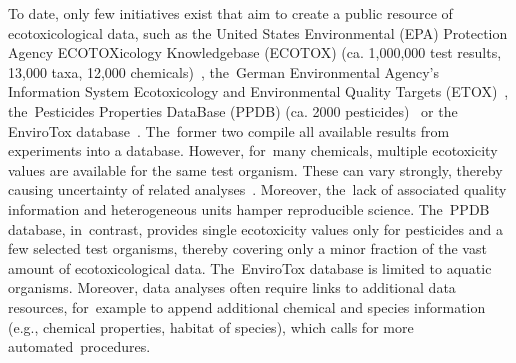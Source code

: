 \documentclass[data,datadescriptor,accept,moreauthors,pdftex]{Definitions/mdpi}
\begin{document}
To date, only few initiatives exist that aim to create a public resource of ecotoxicological data, such as the United States Environmental (EPA) Protection Agency ECOTOXicology Knowledgebase (ECOTOX) (ca. 1,000,000 test results, 13,000 taxa, 12,000 chemicals)~\citep{epa_ecotoxicology_2020}, the~German Environmental Agency's Information System Ecotoxicology and Environmental Quality Targets (ETOX)~\citep{umweltbundesamt_etox_2019}, the~Pesticides Properties DataBase (PPDB) (ca. 2000 pesticides)~\citep{lewis_international_2016} or the EnviroTox database~\citep{healthandenvironmentalsciencesinstitutehesi_envirotox_2019, connors_creation_2019}. The~former two compile all available results from experiments into a database. However, for~many chemicals, multiple ecotoxicity values are available for the same test organism. These  can vary strongly, thereby causing uncertainty of related analyses~\citep{mark_analysis_1998, malaj_physiological_2012}. Moreover, the~lack of associated quality information and heterogeneous units hamper reproducible science. The~PPDB database, in~contrast, provides single ecotoxicity values only for pesticides and a few selected test organisms, thereby covering only a minor fraction of the vast amount of ecotoxicological data. The~EnviroTox database is limited to aquatic organisms. Moreover, data analyses often require links to additional data resources, for~example to append additional chemical and species information (e.g., chemical properties, habitat of species), which calls for more automated~procedures. 
\end{document}
